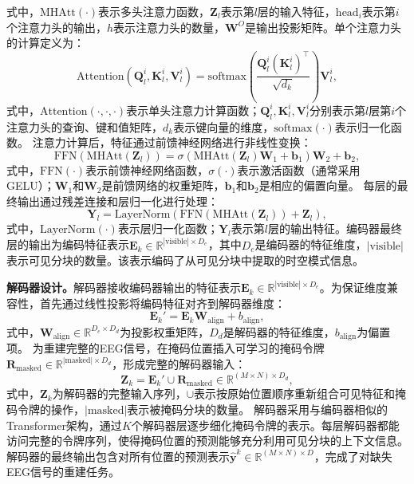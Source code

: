 式中，$\text{MHAtt}(\cdot)$表示多头注意力函数，$\mathbf{Z}_l$表示第$l$层的输入特征，$\text{head}_i$表示第$i$个注意力头的输出，$h$表示注意力头的数量，$\mathbf{W}^O$是输出投影矩阵。单个注意力头的计算定义为：
\begin{equation}
\text{Attention}(\mathbf{Q}_l^i, \mathbf{K}_l^i, \mathbf{V}_l^i) = \text{softmax}\left(\frac{\mathbf{Q}_l^i (\mathbf{K}_l^i)^\top}{\sqrt{d_k}}\right) \mathbf{V}_l^i,
\end{equation}
式中，$\text{Attention}(\cdot, \cdot, \cdot)$表示单头注意力计算函数；$\mathbf{Q}_l^i, \mathbf{K}_l^i, \mathbf{V}_l^i$分别表示第$l$层第$i$个注意力头的查询、键和值矩阵，$d_k$表示键向量的维度，$\text{softmax}(\cdot)$表示归一化函数。
注意力计算后，特征通过前馈神经网络进行非线性变换：
\begin{equation}
\text{FFN}(\text{MHAtt}(\mathbf{Z}_l)) = \sigma\left(\text{MHAtt}(\mathbf{Z}_l)\mathbf{W}_1 + \mathbf{b}_1\right)\mathbf{W}_2 + \mathbf{b}_2,
\end{equation}
式中，$\text{FFN}(\cdot)$表示前馈神经网络函数，$\sigma(\cdot)$表示激活函数（通常采用GELU）；$\mathbf{W}_1$和$\mathbf{W}_2$是前馈网络的权重矩阵，$\mathbf{b}_1$和$\mathbf{b}_2$是相应的偏置向量。
每层的最终输出通过残差连接和层归一化进行处理：
\begin{equation}
\mathbf{Y}_l = \text{LayerNorm}\left(\text{FFN}(\text{MHAtt}(\mathbf{Z}_l)) + \mathbf{Z}_l\right),
\end{equation}
式中，$\text{LayerNorm}(\cdot)$表示层归一化函数；$\mathbf{Y}_l$表示第$l$层的输出特征。编码器最终层的输出为编码特征表示$\mathbf{E}_k \in \mathbb{R}^{|\text{visible}| \times D_e}$，其中$D_e$是编码器的特征维度，$|\text{visible}|$表示可见分块的数量。该表示编码了从可见分块中提取的时空模式信息。


\textbf{解码器设计。}解码器接收编码器输出的特征表示$\mathbf{E}_k \in \mathbb{R}^{|\text{visible}| \times D_e}$。为保证维度兼容性，首先通过线性投影将编码特征对齐到解码器维度：
\begin{equation}
\mathbf{E}_k' = \mathbf{E}_k\mathbf{W}_{\text{align}} + b_{\text{align}},
\end{equation}
式中，$\mathbf{W}_{\text{align}} \in \mathbb{R}^{D_e \times D_d}$为投影权重矩阵，$D_d$是解码器的特征维度，$b_{\text{align}}$为偏置项。
为重建完整的EEG信号，在掩码位置插入可学习的掩码令牌$\mathbf{R}_{\text{masked}} \in \mathbb{R}^{|\text{masked}| \times D_d}$，形成完整的解码器输入：
\begin{equation}
\mathbf{Z}_k = \mathbf{E}_k' \cup \mathbf{R}_{\text{masked}} \in \mathbb{R}^{(M\times N) \times D_d},
\end{equation}
式中，$\mathbf{Z}_k$为解码器的完整输入序列，$\cup$表示按原始位置顺序重新组合可见特征和掩码令牌的操作，$|\text{masked}|$表示被掩码分块的数量。
解码器采用与编码器相似的Transformer架构，通过$K$个解码器层逐步细化掩码令牌的表示。每层解码器都能访问完整的令牌序列，使得掩码位置的预测能够充分利用可见分块的上下文信息。解码器的最终输出包含对所有位置的预测表示$\mathbf{\hat{y}}^k \in \mathbb{R}^{(M\times N) \times D}$，完成了对缺失EEG信号的重建任务。



